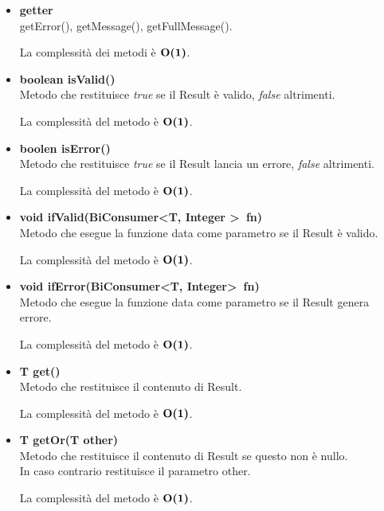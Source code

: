 \documentclass[a4paper, 12pt]{scrreprt}
\begin{document}
				\begin{itemize}
					\item \textbf{getter}
					\\getError(), getMessage(), getFullMessage().
					
					La complessit\`a dei metodi \`e $\mathbf{O}\textbf{(1)}$.
					
					\item\textbf{boolean isValid()}
					\\Metodo che restituisce \textit{true} se il Result \`e valido, \textit{false} altrimenti.
					
					La complessit\`a del metodo \`e $\mathbf{O}\textbf{(1)}$.
					
					\item\textbf{boolen isError()}
					\\Metodo che restituisce \textit{true} se il Result lancia un errore, \textit{false} altrimenti.
					
					La complessit\`a del metodo \`e $\mathbf{O}\textbf{(1)}$.
	
					\item\textbf{void ifValid(BiConsumer\textless T, Integer \textgreater~fn)}
					\\Metodo che esegue la funzione data come parametro se il Result \`e valido.
					
					La complessit\`a del metodo \`e $\mathbf{O}\textbf{(1)}$.
	
					\item\textbf{void ifError(BiConsumer\textless T, Integer\textgreater~fn)}
					\\Metodo che esegue la funzione data come parametro se il Result genera errore.
					
					La complessit\`a del metodo \`e $\mathbf{O}\textbf{(1)}$.
	
					\item \textbf{T get()}
					\\Metodo che restituisce il contenuto di Result.
					
					La complessit\`a del metodo \`e $\mathbf{O}\textbf{(1)}$.
	
					\item \textbf{T getOr(T other)}
					\\Metodo che restituisce il contenuto di Result se questo non \`e nullo.
					\\ In caso contrario restituisce il parametro other.
					
					La complessit\`a del metodo \`e $\mathbf{O}\textbf{(1)}$.
	

\end{itemize}
\end{document}

